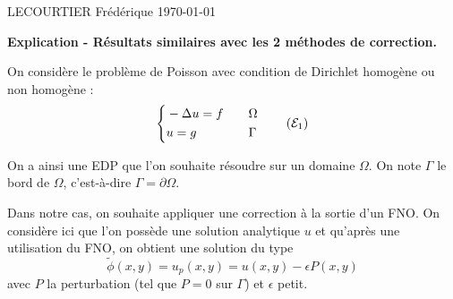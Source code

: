 \documentclass[french]{article}
\begin{document}
	LECOURTIER Frédérique \hfill \today
	\begin{center}
		\Large\textbf{{Explication - Résultats similaires avec les 2 méthodes de correction.}}\\
	\end{center}
	\graphicspath{{images/}}
	
	On considère le problème de Poisson avec condition de Dirichlet homogène ou non homogène :
	\begin{equation}
		\label{pb1}
		\left\{\begin{aligned}
			&-\Delta u=f \quad &&\Omega \\
			&u=g \quad &&\Gamma
		\end{aligned}\right. \tag{$\mathcal{E}_1$}
	\end{equation}
	
	On a ainsi une EDP que l'on souhaite résoudre sur un domaine $\Omega$. On note $\Gamma$ le bord de $\Omega$, c'est-à-dire $\Gamma=\partial\Omega$. 
	
	Dans notre cas, on souhaite appliquer une correction à la sortie d'un FNO.
	On considère ici que l'on possède une solution analytique $u$ et qu'après une utilisation du FNO, on obtient une solution du type
	\begin{equation*}
		\label{phi_tild}
		\tilde{\phi}(x,y)=u_p(x,y) = u(x,y)-\epsilon P(x,y)
	\end{equation*}
	avec $P$ la perturbation (tel que $P=0$ sur $\Gamma$) et $\epsilon$ petit.
	
\end{document}
